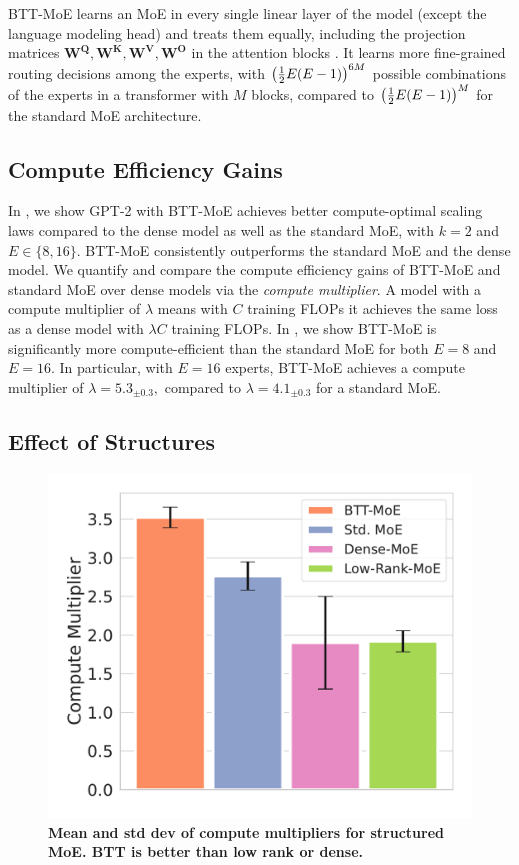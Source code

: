 \documentclass{article}
\newcommand{\mbf}[1]{{\boldsymbol{\mathbf{#1}}}}
\newcommand{\bm}{\mbf}
\begin{document}
BTT-MoE learns an MoE in every single linear layer of the model (except the language modeling head) and treats them equally, including the projection matrices $\bm{W^Q}, \bm{W^K}, \bm{W^V}, \bm{W^O}$ in the attention blocks \citep{vaswani2017attention}. It learns more fine-grained routing decisions among the experts, with $\qty(\frac{1}{2}E(E-1))^{6M}$ possible combinations of the experts in a transformer with $M$ blocks, compared to $\qty(\frac{1}{2}E(E-1))^{M}$ for the standard MoE architecture.

\subsection{Compute Efficiency Gains}
In , we show GPT-2 with BTT-MoE achieves better compute-optimal scaling laws compared to the dense model as well as the standard MoE, with $k=2$ and $E \in \{8, 16\}$. BTT-MoE consistently outperforms the standard MoE and the dense model. We quantify and compare the compute efficiency gains of BTT-MoE and standard MoE over dense models via the \textit{compute multiplier}. A model with a compute multiplier of $\lambda$ means with $C$ training FLOPs it achieves the same loss as a dense model with $\lambda C$ training FLOPs. In , we show BTT-MoE is significantly more compute-efficient than the standard MoE for both $E=8$ and $E=16$. In particular, with $E=16$ experts, BTT-MoE achieves a compute multiplier of $\lambda=5.3_{\pm0.3},$ compared to $\lambda=4.1_{\pm0.3}$ for a standard MoE.
\subsection{Effect of Structures}
\begin{figure}
    \vspace{-2mm}
  \includegraphics[width=\linewidth]{figs/compute_moe_summary_all_8.pdf}
  \vspace{-5mm}
  \caption{\footnotesize \textbf{Mean and std dev of compute multipliers for structured MoE. BTT is better than low rank or dense.}}
  \label{fig:overall_moe_8}
  \vspace{-10mm}
\end{figure}
\end{document}

